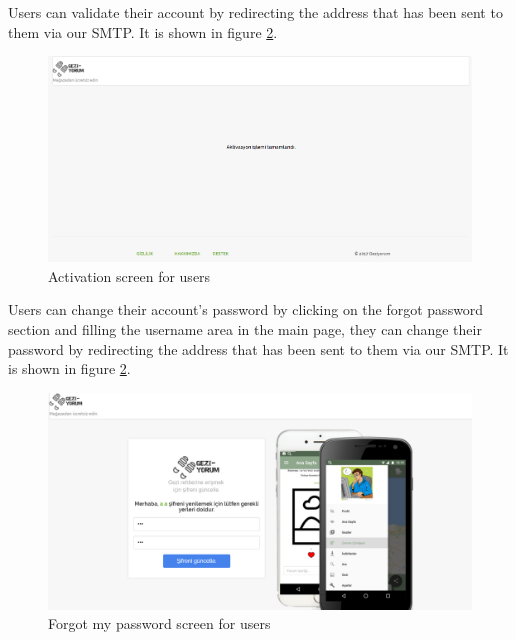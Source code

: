 \newpage

Users can validate their account by redirecting the address that has been sent to them via our SMTP. It is shown in figure  \ref{fig:registerWeb}. 

\begin{figure}[!htbp]
\centering
\includegraphics[width=\textwidth]{projectChapters/images/activasion.png}
\caption{Activation screen for users}
\label{fig:registerWeb}
\end{figure}

\newpage

Users can change their account's password by clicking on the forgot password section and filling the username area in the main page, they can change their password by redirecting the address that has been sent to them via our SMTP. It is shown in figure  \ref{fig:registerWeb}. 

\begin{figure}[!htbp]
\centering
\includegraphics[width=\textwidth]{projectChapters/images/forgetpass.png}
\caption{Forgot my password screen for users}
\label{fig:registerWeb}
\end{figure}





\newpage

